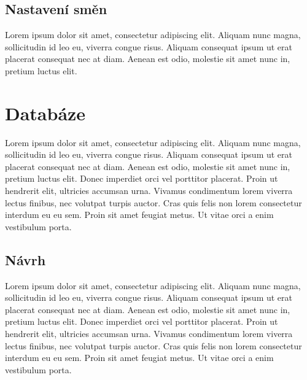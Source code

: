 \subsection{Nastavení směn}
Lorem ipsum dolor sit amet, consectetur adipiscing elit.
Aliquam nunc magna, sollicitudin id leo eu, viverra congue risus.
Aliquam consequat ipsum ut erat placerat consequat nec at diam. 
Aenean est odio, molestie sit amet nunc in, pretium luctus elit. 



\section{Databáze}
Lorem ipsum dolor sit amet, consectetur adipiscing elit.
Aliquam nunc magna, sollicitudin id leo eu, viverra congue risus.
Aliquam consequat ipsum ut erat placerat consequat nec at diam. 
Aenean est odio, molestie sit amet nunc in, pretium luctus elit. 
Donec imperdiet orci vel porttitor placerat. 
Proin ut hendrerit elit, ultricies accumsan urna. 
Vivamus condimentum lorem viverra lectus finibus, nec volutpat turpis auctor.
Cras quis felis non lorem consectetur interdum eu eu sem. 
Proin sit amet feugiat metus. 
Ut vitae orci a enim vestibulum porta. 


\subsection{Návrh}
Lorem ipsum dolor sit amet, consectetur adipiscing elit.
Aliquam nunc magna, sollicitudin id leo eu, viverra congue risus.
Aliquam consequat ipsum ut erat placerat consequat nec at diam. 
Aenean est odio, molestie sit amet nunc in, pretium luctus elit. 
Donec imperdiet orci vel porttitor placerat. 
Proin ut hendrerit elit, ultricies accumsan urna. 
Vivamus condimentum lorem viverra lectus finibus, nec volutpat turpis auctor.
Cras quis felis non lorem consectetur interdum eu eu sem. 
Proin sit amet feugiat metus. 
Ut vitae orci a enim vestibulum porta. 

\newpage